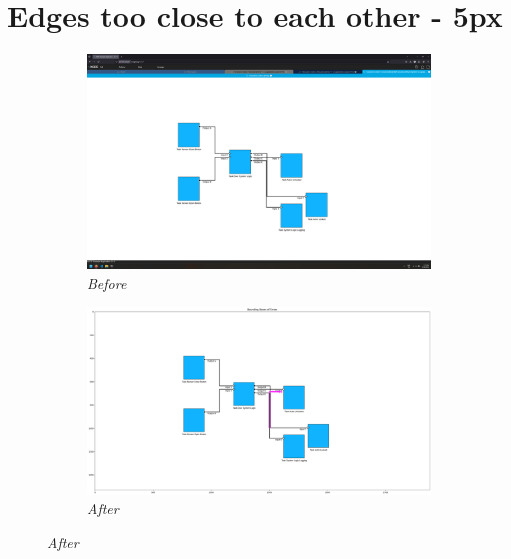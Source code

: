 \documentclass{article}
\begin{document}
\section{Edges too close to each other - 5px}
\begin{figure}[H]
    \centering
    \begin{subfigure}[t]{0.9\textwidth}
        \centering
        \includegraphics[width=\textwidth]{testcases/edge_too_close_5px_assisted/151733-188571_input_image.png}
        \caption*{\textit{Before}}
    \end{subfigure}
    \newline    
    \begin{subfigure}[t]{0.9\textwidth}
        \centering
        \includegraphics[width=\textwidth]{testcases/edge_too_close_5px_assisted/151745-239534_element_bbox_errors_labeled_colored.png}
        \caption*{\textit{After}}
    \end{subfigure}
    \label{fig:edges_too_close_5}
\end{figure}
\newpage
\end{document}

